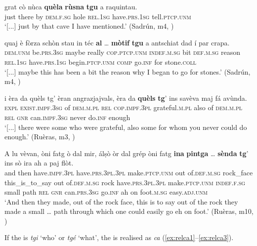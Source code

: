 \ea\label{relprepda}
\gll [...] grat cò nùca \textbf{quèla} \textbf{rùsna} \textbf{tgu} a raquintau.\\
{} just there by \textsc{dem.f.sg} hole \textsc{rel.1sg} have.\textsc{prs.1sg} tell.\textsc{ptcp.unm}\\  
\glt `[...] just by that cave I have mentioned.' (Sadrún, m4, )
\z

\ea\label{relpreppar1}
\gll  [...] quaj è fòrza schòn stau in téc \textbf{al} … \textbf{mòtif} \textbf{tgu} a antschiat dad í par crapa.\\
{} \textsc{dem.unm} be.\textsc{prs.3sg} maybe really  \textsc{cop.ptcp.unm} \textsc{indef.m.sg} bit \textsc{def.m.sg} {} reason \textsc{rel.1sg} have.\textsc{prs.1sg} begin.\textsc{ptcp.unm} \textsc{comp} go.\textsc{inf} for stone.\textsc{coll}\\
\glt `[...] maybe this has been a bit the reason why I began to go for stones.' (Sadrún, m4, )
\z

\ea
\label{relpreppar2}
\gll [...] i èra da quèls tg’ èran angrazjajvals, èra da \textbf{quèls} \textbf{tg}’ ins savèva maj fá avùnda.\\
 {} \textsc{expl} \textsc{\textbf{}exist.impf.3sg} of \textsc{dem.m.pl} \textsc{rel} \textsc{cop.impf.3pl} grateful.\textsc{m.pl} also of \textsc{dem.m.pl} \textsc{rel} \textsc{gnr} can.\textsc{impf.3sg} never do.\textsc{inf} enough\\
\glt `[...] there were some who were grateful, also some for whom you never could do enough.' (Ruèras, m3, )
\z

\ea
\label{relpreptras}
\gll  A lu vèvan, òni fatg ò dal mir, álṣò òr dal grép òni fatg \textbf{ina} \textbf{pintga} …  \textbf{sènda} \textbf{tg}’ ins sò ira ah a paj flòt.\\
and then have.\textsc{impf.3pl} have.\textsc{prs.3pl.3pl} make.\textsc{ptcp.unm} out of.\textsc{def.m.sg} rock\_face this\_is\_to\_say out of.\textsc{def.m.sg} rock have.\textsc{prs.3pl.3pl} make.\textsc{ptcp.unm} \textsc{indef.f.sg} small {} path \textsc{rel} \textsc{gnr} can.\textsc{prs.3sg} go.\textsc{inf} ah on foot.\textsc{m.sg} easy.\textsc{adj.unm} \\
\glt `And then they made, out of the rock face, this is to say out of the rock they made a small … path through which one could easily go eh on foot.' (Ruèras, m10, )
\z

If the  is \textit{tgi} `who' or \textit{tgé} `what', the  is realised as \textit{ca} (\ref{ex:relca1}--\ref{ex:relca3}).

